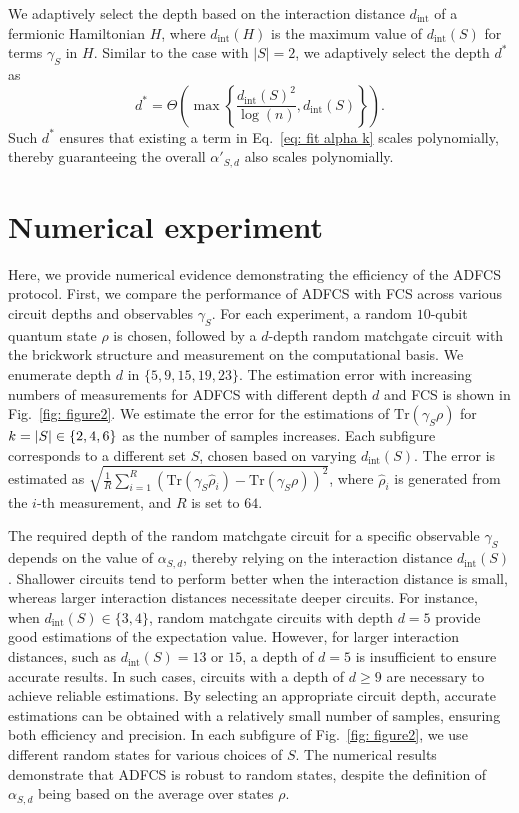 \documentclass[journal=jctcce,a4paper,manuscript=article]{achemso}
\newcommand{\cbra}[1]{\{ #1 \}}
\newcommand{\tra}[1]{\text{Tr}\left( #1 \right)}
\begin{document}
We adaptively select the depth based on the interaction distance $
  d_{\text{int}} $ of a fermionic Hamiltonian $H$, where $d_{\text{int}}(H)$ is
the maximum value of $d_{\text{int}}(S)$ for terms $\gamma_S$ in $H$. Similar
to the case with $|S|=2$, we adaptively select the depth $d^\ast$ as
\begin{equation}
  d^\ast = \Theta\left(\max\left\{ \frac{d_{\text{int}}(S)^2}{\log(n)} , d_{\text{int}}(S)\right\}\right).
  \label{eq: adaptive depth}
\end{equation}
Such $ d^\ast $ ensures that {existing} a term in Eq.~\eqref{eq: fit alpha k} scales polynomially, thereby guaranteeing the overall $\alpha'_{S,d}$ also scales polynomially.

\section{Numerical experiment}
\label{sec: numerical exp}

Here, we provide numerical evidence demonstrating the efficiency of the ADFCS
protocol. First, we compare the performance of ADFCS with FCS across various
circuit depths and observables $\gamma_S$. For each experiment, a random
$10$-qubit quantum state $\rho$ is chosen, followed by a $d$-depth random
matchgate circuit with the brickwork structure and measurement on the
computational basis. We enumerate depth $d$ in $\cbra{5,9,15,19,23}$. The
estimation error with increasing numbers of measurements for ADFCS with
different depth $d$ and FCS is shown in Fig.~\ref{fig: figure2}. We estimate
the error for the estimations of $\tra{\gamma_S \rho}$ for $k=\abs{S}
  \in\cbra{2,4,6}$ as the number of samples increases. Each subfigure corresponds
to a different set $S$, chosen based on varying $d_\text{int}(S)$. The error is
estimated as $\sqrt{\frac{1}{R}\sum_{i = 1}^R (\tra{\gamma_S\hat{\rho}_i} -
    \tra{\gamma_S\rho})^2} $, where $\hat{\rho}_i$ is generated from the $i$-th
measurement, and $R$ is set to $64$.

The required depth of the random matchgate circuit for a specific observable
$\gamma_S$ depends on the value of $\alpha_{S,d}$, thereby relying on the
interaction distance $d_\text{int}(S)$. Shallower circuits tend to perform
better when the interaction distance is small, whereas larger interaction
distances necessitate deeper circuits. For instance, when $d_\text{int}(S)\in
  \{3,4\} $, random matchgate circuits with depth $d = 5$ provide good
estimations of the expectation value. However, for larger interaction
distances, such as $d_\text{int}(S) = 13$ or $15$, a depth of $d = 5$ is
insufficient to ensure accurate results. In such cases, circuits with a depth
of $d \geq 9$ are necessary to achieve reliable estimations. By selecting an
appropriate circuit depth, accurate estimations can be obtained with a
relatively small number of samples, ensuring both efficiency and precision. In
each subfigure of Fig.~\ref{fig: figure2}, we use different random states for
various choices of $S$. The numerical results demonstrate that ADFCS is robust
to random states, despite the definition of $\alpha_{S,d}$ being based on the
average over states $\rho$.
\end{document}
